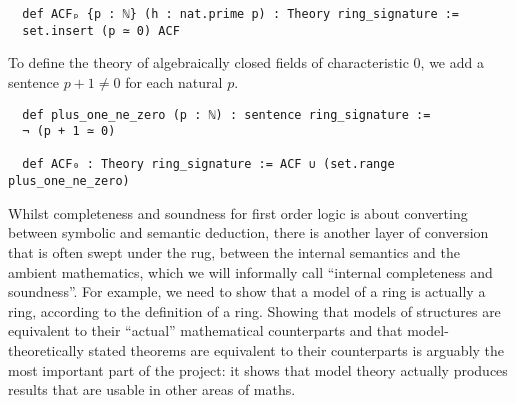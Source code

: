 \begin{dfn}
  \begin{lstlisting}
  def ACFₚ {p : ℕ} (h : nat.prime p) : Theory ring_signature :=
  set.insert (p ≃ 0) ACF\end{lstlisting}

  To define the theory of algebraically closed fields of characteristic $0$,
  we add a sentence $p + 1 \ne 0$ for each natural $p$.

  \begin{lstlisting}
  def plus_one_ne_zero (p : ℕ) : sentence ring_signature :=
  ¬ (p + 1 ≃ 0)

  def ACF₀ : Theory ring_signature := ACF ∪ (set.range plus_one_ne_zero)  \end{lstlisting}

\end{dfn}

  Whilst completeness and soundness for first order logic
  is about converting between symbolic and semantic deduction,
  there is another layer of conversion that is often swept under the rug,
  between the internal semantics and the ambient mathematics,
  which we will informally call ``internal completeness and soundness''.
  For example, we need to show that a model of a ring is
  actually a ring, according to the  definition of a ring.
  Showing that models of structures are equivalent to their ``actual'' mathematical counterparts
  and that model-theoretically stated theorems are equivalent to
  their counterparts is arguably the most important part of the project:
  it shows that model theory actually produces results that are usable
  in other areas of maths.




